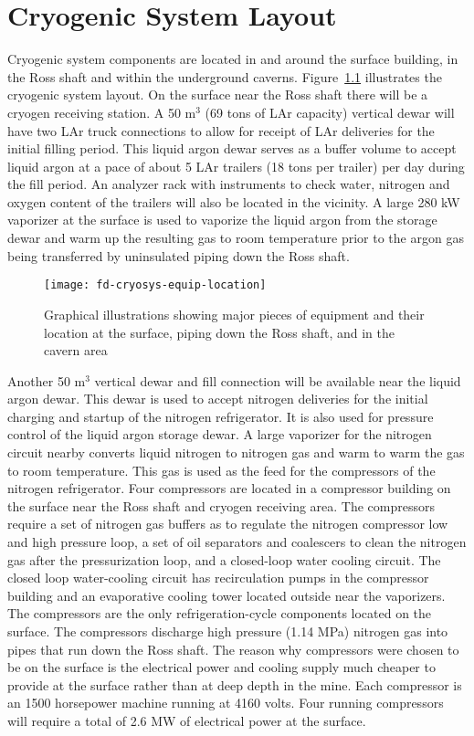 \chapter{Cryogenic System Layout}
\label{sec:cryo-cryosys-layout}

Cryogenic system components are located in and around the surface 
building, in the Ross shaft and within the underground caverns. 
Figure~\ref{fig:eqp-at-surface} illustrates 
the cryogenic system layout. On the surface near the Ross 
shaft there will be a cryogen 
receiving station. A 50 m$^3$ (69 tons of LAr capacity) 
vertical dewar will have two LAr truck connections 
to allow for receipt of LAr deliveries for the initial
filling period. This liquid argon dewar serves as a buffer volume 
to accept liquid argon at a pace of about 5 LAr trailers 
(18 tons per trailer) per day during the fill period. An analyzer
rack with instruments to check water, nitrogen and oxygen content 
of the trailers will also be located in the vicinity. A large 
280 kW vaporizer at the surface is used to vaporize the liquid
argon from the storage dewar and warm up the resulting gas to 
room temperature prior to the argon gas being 
transferred by uninsulated piping down the Ross shaft.

\begin{figure}[htbp]
\centering
\texttt{[image: fd-cryosys-equip-location]} 
\caption{Graphical illustrations showing major pieces of equipment and their location at the
surface, piping down the Ross shaft, and in the cavern area}
\label{fig:eqp-at-surface}
\end{figure}

Another 50 m$^3$ vertical dewar and fill connection will be 
available near the liquid argon dewar. This dewar is used 
to accept nitrogen deliveries for the initial charging and startup of
the nitrogen refrigerator. It is also used for pressure control of 
the liquid argon storage dewar. A large vaporizer for the nitrogen 
circuit nearby converts liquid nitrogen to nitrogen gas and warm to
warm the gas to room temperature. This gas is used as the feed for
the compressors of the nitrogen refrigerator. Four compressors are 
located in a compressor building on the surface near the Ross shaft 
and cryogen receiving area. The compressors require a set of nitrogen 
gas buffers as to regulate the nitrogen compressor low and high 
pressure loop, a set of oil separators and coalescers to clean the 
nitrogen gas after the pressurization loop, and a closed-loop water 
cooling circuit. The closed loop water-cooling circuit has 
recirculation pumps in the compressor 
building and an evaporative cooling tower located outside 
near the vaporizers. The compressors are the only refrigeration-cycle 
components located on the surface. The compressors discharge high 
pressure (1.14 MPa) nitrogen gas into
pipes that run down the Ross shaft. 
The reason why compressors were chosen to be on the 
surface is the electrical power and cooling supply 
much cheaper to provide at the surface rather 
than at deep depth in the mine. Each compressor is an 
1500 horsepower machine running at 4160 volts. 
Four running compressors will require a total of
2.6 MW of electrical power at the surface.


